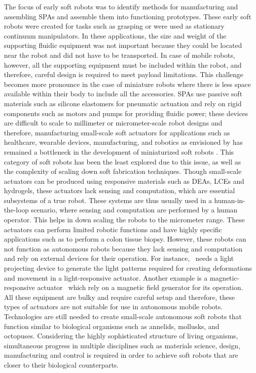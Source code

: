 The focus of early soft robots was to identify methods for manufacturing and assembling SPAs and assemble them into functioning prototypes. These early soft robots were created for tasks such as grasping or were used as stationary continuum manipulators. In these applications, the size and weight of the supporting fluidic equipment was not important because they could be located near the robot and did not have to be transported. In case of mobile robots, however, all the supporting equipment must be included within the robot, and therefore, careful design is required to meet payload limitations. This challenge becomes more pronounce in the case of miniature robots where there is less space available within their body to include all the accessories. SPAs use passive soft materials such as silicone elastomers for pneumatic actuation and rely on rigid components such as motors and pumps for providing fluidic power; these devices are difficult to scale to millimeter or micrometer-scale robot designs and therefore, manufacturing small-scale soft actuators for applications such as healthcare, wearable devices, manufacturing, and robotics as envisioned by \cite{Hines2017} has remained a bottleneck in the development of miniaturized soft robots \cite{Majidi2019}. This category of soft robots has been the least explored due to this issue, as well as the complexity of scaling down soft fabrication techniques. Though small-scale actuators can be produced using responsive materials such as DEAs, LCEs and hydrogels, these actuators lack sensing and computation, which are essential subsystems of a true robot. These systems are thus usually used in a human-in-the-loop scenario, where sensing and computation are performed by a human operator. This helps in down scaling the robots to the micrometer range. These actuators can perform limited robotic functions and have highly specific applications such as to perform a colon tissue biopsy. However, these robots can not function as autonomous robots because they lack sensing and computation and rely on external devices for their operation. For instance,~\cite{Palagi2016} needs a light projecting device to generate the light patterns required for creating deformations and movement in a light-responsive actuator. Another example is a magnetic-responsive actuator~\cite{Kim2018} which rely on a magnetic field generator for its operation. All these equipment are bulky and require careful setup and therefore, these types of actuators are not suitable for use in autonomous mobile robots. Technologies are still needed to create small-scale autonomous soft robots that function similar to biological organisms such as annelids, mollusks, and octopuses. Considering the highly sophisticated structure of living organisms, simultaneous progress in multiple disciplines such as materials science, design, manufacturing and control is required in order to achieve soft robots that are closer to their biological counterparts.
